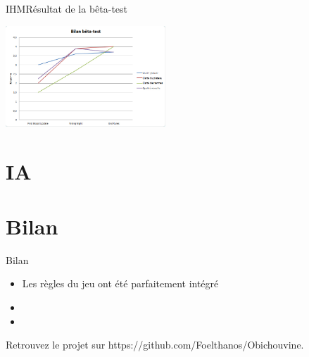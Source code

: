 \documentclass{beamer}
\begin{document}
\begin{frame}{IHM}{Résultat de la bêta-test}
 \begin{center}
\includegraphics[width=6cm]{resBeta.jpg}
\end{center}
\end{frame}

\section{IA}


\section{Bilan}

\begin{frame}{Bilan}

  \begin{itemize}
  \item Les règles du jeu ont été parfaitement intégré 
  \item 
  \item 
  \end{itemize}
  
	Retrouvez le projet sur https://github.com/Foelthanos/Obichouvine.
 
\end{frame}
\end{document}
